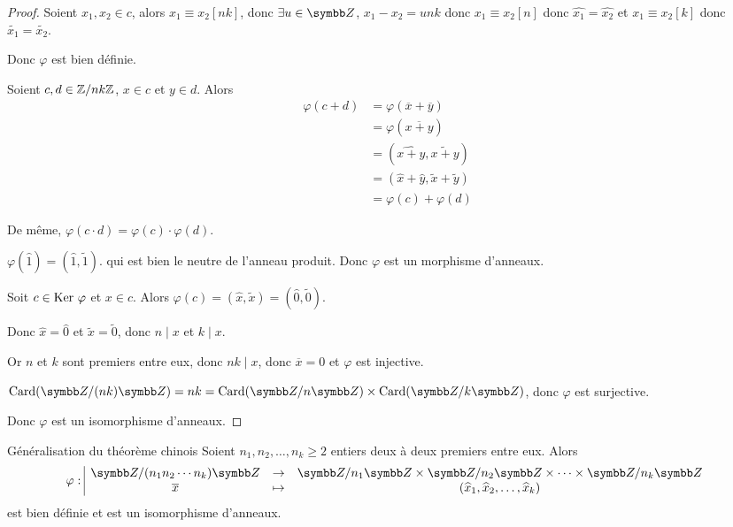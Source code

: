 \begin{proof}
    Soient $x_1, x_2 \in c$, alors $x_1 \equiv x_2 [nk]$, donc $\exists u \in \Z$, 
    $x_1 - x_2 = unk$ donc $x_1 \equiv x_2 [n]$ donc $\widehat{x_1} = \widehat{x_2}$ 
    et $x_1 \equiv x_2 [k]$ donc $\widetilde{x_1} = \widetilde{x_2}$.

    Donc $\varphi$ est bien définie.

    \avspace Soient $c, d \in \mathbb{Z}/nk\mathbb{Z}$, $x \in c$ et $y \in d$. Alors 
    \begin{align*}
        \varphi(c + d) & = \varphi(\overline x + \overline y) \\
        & = \varphi(\overline{x + y}) \\
        & = (\widehat{x + y}, \widetilde{x + y}) \\
        & = (\widehat x + \widehat y, \widetilde x + \widetilde y) \\
        & = \varphi(c) + \varphi(d)
    \end{align*}

    De même, $\varphi(c \cdot d) = \varphi(c) \cdot \varphi(d)$.

    $\varphi(\widehat 1) = (\widehat 1, \widetilde 1)$. qui est bien le neutre de l'anneau 
    produit. Donc $\varphi$ est un morphisme d'anneaux.

    \lvspace Soit $c \in \operatorname{Ker} \, \varphi$ et $x \in c$. 
    Alors $\varphi(c) = (\widehat x, \widetilde x) = (\widehat 0, \widetilde 0)$.

    Donc $\widehat x = \widehat 0$ et $\widetilde x = \widetilde 0$, donc $n \mid x $ et $k \mid x$.

    Or $n$ et $k$ sont premiers entre eux, donc $nk \mid x$, donc $\overline x = 0$ et 
    $\varphi$ est injective.

    $\operatorname{Card}(\Z / (nk) \Z) = nk = \operatorname{Card}(\Z / n \Z) \times \operatorname{Card}(\Z / k \Z)$, donc
    $\varphi$ est surjective.

    Donc $\varphi$ est un isomorphisme d'anneaux.
\end{proof}

\begin{proposition}{Généralisation du théorème chinois}{}
    Soient $n_1, n_2, \ldots, n_k \geqslant 2$ entiers deux à deux premiers entre eux. 
    Alors \[\fonction{\varphi}{\Z / (n_1 n_2 \cdots n_k) \Z}{\Z / n_1 \Z \times \Z / n_2 \Z \times \cdots \times \Z / n_k \Z}{\overline x}{(\widehat x_1, \widehat x_2, \ldots, \widehat x_k)}\]
    est bien définie et est un isomorphisme d'anneaux.
\end{proposition}

